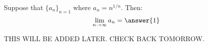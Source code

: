 \documentclass{ximera}
\author{Jim Talamo}
\begin{document}
\begin{exercise}

Suppose that $\{a_n \}_{n=1}$ where $a_n =n^{1/n}$.  Then:
\[
\lim_{n \to \infty} a_n = \answer{1}
\]

\begin{hint}
THIS WILL BE ADDED LATER.  CHECK BACK TOMORROW.
\end{hint}

\end{exercise}
\end{document}
